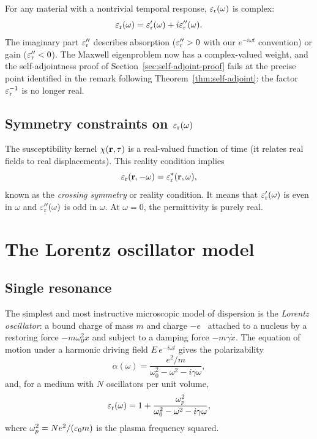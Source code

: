 For any material with a nontrivial temporal response, $\varepsilon_{\mathrm{r}}(\omega)$ is
complex:
\begin{equation}
 \varepsilon_{\mathrm{r}}(\omega) = \varepsilon_{\mathrm{r}}'(\omega) + i\varepsilon_{\mathrm{r}}''(\omega).
 \label{eq:eps-complex}
\end{equation}
The imaginary part $\varepsilon_{\mathrm{r}}''$ describes absorption ($\varepsilon_{\mathrm{r}}'' > 0$ with our
$e^{-i\omega t}$ convention) or gain ($\varepsilon_{\mathrm{r}}'' < 0$). The Maxwell
eigenproblem now has a complex-valued weight, and the self-adjointness
proof of Section~\ref{sec:self-adjoint-proof} fails at the precise point
identified in the remark following Theorem~\ref{thm:self-adjoint}: the
factor $\varepsilon_{\mathrm{r}}^{-1}$ is no longer real.

\subsection{Symmetry constraints on $\varepsilon_{\mathrm{r}}(\omega)$}
\label{ssec:eps-symmetry}

The susceptibility kernel $\chi(\mathbf{r},\tau)$ is a real-valued function of
time (it relates real fields to real displacements). This reality
condition implies
\begin{equation}
 \varepsilon_{\mathrm{r}}(\mathbf{r},-\omega) = \varepsilon_{\mathrm{r}}^*(\mathbf{r},\omega),
 \label{eq:eps-reality}
\end{equation}
known as the \emph{crossing symmetry} or reality condition. It means
that $\varepsilon_{\mathrm{r}}'(\omega)$ is even in $\omega$ and $\varepsilon_{\mathrm{r}}''(\omega)$ is odd
in $\omega$. At $\omega = 0$, the permittivity is purely real.


\section{The Lorentz oscillator model}
\label{sec:lorentz}

\subsection{Single resonance}
\label{ssec:lorentz-single}

The simplest and most instructive microscopic model of dispersion is the
\emph{Lorentz oscillator}: a bound charge of mass $m$ and charge $-e$~\cite{adams1976spectroscopy}
attached to a nucleus by a restoring force $-m\omega_0^2 x$ and subject to
a damping force $-m\gamma\dot{x}$. The equation of motion under a
harmonic driving field $E\,e^{-i\omega t}$ gives the polarizability
\begin{equation}
 \alpha(\omega)
 = \frac{e^2/m}{\omega_0^2 - \omega^2 - i\gamma\omega},
 \label{eq:lorentz-alpha}
\end{equation}
and, for a medium with $N$ oscillators per unit volume,
\begin{equation}
 \varepsilon_{\mathrm{r}}(\omega) = 1 + \frac{\omega_p^2}
 {\omega_0^2 - \omega^2 - i\gamma\omega},
 \label{eq:lorentz-eps}
\end{equation}
where $\omega_p^2 = Ne^2/(\varepsilon_0 m)$ is the plasma frequency squared.

